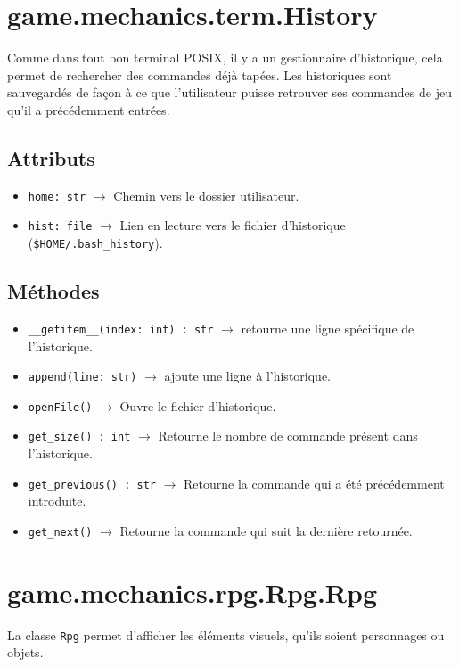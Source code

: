 \documentclass{report}
\begin{document}
\section{game.mechanics.term.History}
Comme dans tout bon terminal POSIX, il y a un gestionnaire d’historique, cela permet de rechercher des commandes déjà tapées.
Les historiques sont sauvegardés de façon à ce que l'utilisateur puisse retrouver ses commandes de jeu qu'il a précédemment entrées.

\subsection*{Attributs}

\begin{itemize}
  \item \texttt{home: str}	$\rightarrow$ Chemin vers le dossier utilisateur.
  \item \texttt{hist: file}		$\rightarrow$ Lien en lecture vers le fichier d’historique (\texttt{\$HOME/.bash_history}). %
\end{itemize}

\subsection*{Méthodes}
\begin{itemize}
\item \texttt{__getitem__(index: int) : str}	$\rightarrow$ retourne une ligne spécifique de l’historique.
\item \texttt{append(line: str)}	$\rightarrow$  ajoute une ligne à l’historique.
\item \texttt{openFile()}	$\rightarrow$ Ouvre le fichier d’historique.
\item \texttt{get_size() : int}	$\rightarrow$ Retourne le nombre de commande présent dans l'historique.
\item \texttt{get_previous() : str}	$\rightarrow$ Retourne la commande qui a été précédemment introduite.
\item \texttt{get_next()}	$\rightarrow$ Retourne la commande qui suit la dernière retournée.

\end{itemize}

\newpage

\section{game.mechanics.rpg.Rpg.Rpg}
La classe \texttt{Rpg} permet d’afficher les éléments visuels, qu'ils soient personnages ou objets.
\end{document}
